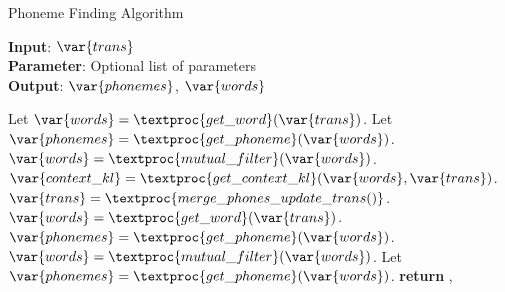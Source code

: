 \begin{algorithm}[tb]
\caption{Phoneme Finding Algorithm}
\label{alg:pfa}
\textbf{Input}: $\var{trans}$\\
\textbf{Parameter}: Optional list of parameters\\
\textbf{Output}: $\var{phonemes}$, $\var{words}$
\begin{algorithmic}[1] %
\STATE Let $\var{words} = \textproc{get\_word}(\var{trans})$.
\STATE Let $\var{phonemes} = \textproc{get\_phoneme}(\var{words})$.
\STATE $\var{words} = \textproc{mutual\_filter}(\var{words})$.
\STATE $\var{context\_kl} = \textproc{get\_context\_kl}(\var{words}, \var{trans})$.
\STATE $\var{trans} = \textproc{merge\_phones\_update\_trans()}$.
\STATE $\var{words} = \textproc{get\_word}(\var{trans})$.
\STATE $\var{phonemes} = \textproc{get\_phoneme}(\var{words})$.
\ENDWHILE
\STATE $\var{words} = \textproc{mutual\_filter}(\var{words})$.
\STATE Let $\var{phonemes} = \textproc{get\_phoneme}(\var{words})$.
\STATE \textbf{return} , 
\end{algorithmic}
\end{algorithm}


